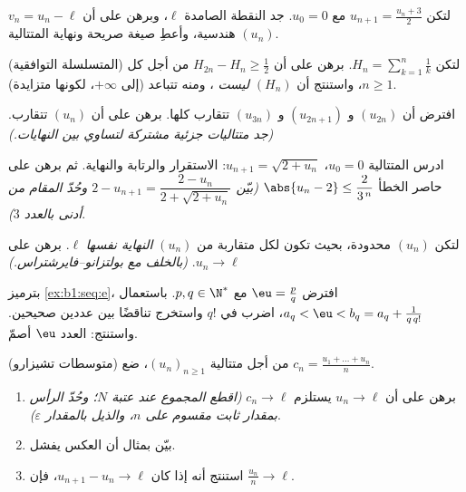 \begin{exercise}[$\star$]\label{exo:b1:seq:4}
لتكن $u_{n+1} = \frac{u_n + 3}{2}$ مع $u_0 = 0$. جد النقطة الصامدة
$\ell$، وبرهن على أن $v_n = u_n - \ell$ هندسية، وأعطِ صيغة
صريحة ونهاية المتتالية $(u_n)$.
\end{exercise}

\begin{exercise}[$\star\star$]\label{exo:b1:seq:5}
(المتسلسلة التوافقية) لتكن $H_n = \sum_{k=1}^{n} \frac 1k$. برهن على أن
$H_{2n} - H_n \geq \frac12$ من أجل كل $n \geq 1$، واستنتج أن
$(H_n)$ \emph{ليست} ، ومنه تتباعد (إلى
$+\infty$، لكونها متزايدة).
\end{exercise}

\begin{exercise}[$\star\star$]\label{exo:b1:seq:6}
افترض أن $(u_{2n})$ و $(u_{2n+1})$ و $(u_{3n})$ تتقارب كلها. برهن
على أن $(u_n)$ تتقارب. \emph{(جد متتاليات جزئية مشتركة لتساوي بين
النهايات.)}
\end{exercise}

\begin{exercise}[$\star\star$]\label{exo:b1:seq:7}
ادرس المتتالية $u_0 = 0$، $u_{n+1} = \sqrt{2 + u_n}$:
الاستقرار والرتابة والنهاية. ثم برهن على حاصر الخطأ
$\abs{u_n - 2} \leq \dfrac{2}{3^{\,n}}$ \emph{(بيّن $2 - u_{n+1} =
\dfrac{2 - u_n}{2 + \sqrt{2 + u_n}}$ وحُدّ المقام من أدنى
بالعدد $3$)}.
\end{exercise}

\begin{exercise}[$\star\star$]\label{exo:b1:seq:8}
لتكن $(u_n)$ محدودة، بحيث تكون لكل  متقاربة من
$(u_n)$ \emph{النهاية نفسها} $\ell$. برهن على $u_n \to \ell$.
\emph{(بالخلف مع بولتزانو--فايرشتراس.)}
\end{exercise}

\begin{exercise}[$\star\star\star$]\label{exo:b1:seq:9}
بترميز \cref{ex:b1:seq:e}، افترض $\eu = \frac pq$
مع $p, q \in \N^*$. باستعمال $a_q < \eu < b_q = a_q + \frac{1}{q\,
q!}$، اضرب في $q!$ واستخرج تناقضًا بين عددين
صحيحين. واستنتج: العدد $\eu$ أصمّ.
\end{exercise}

\begin{exercise}[$\star\star\star$]\label{exo:b1:seq:10}
(متوسطات تشيزارو) من أجل متتالية $(u_n)_{n \geq 1}$، ضع $c_n =
\frac{u_1 + \dots + u_n}{n}$.
\begin{enumerate}
  \item برهن على أن $u_n \to \ell$ يستلزم $c_n \to \ell$ \emph{(اقطع
        المجموع عند عتبة $N$؛ وحُدّ الرأس بمقدار ثابت
        مقسوم على $n$، والذيل بالمقدار $\varepsilon$)}.
  \item بيّن بمثال أن العكس يفشل.
  \item استنتج أنه إذا كان $u_{n+1} - u_n \to \ell$، فإن $\frac{u_n}{n}
        \to \ell$.
\end{enumerate}
\end{exercise}

